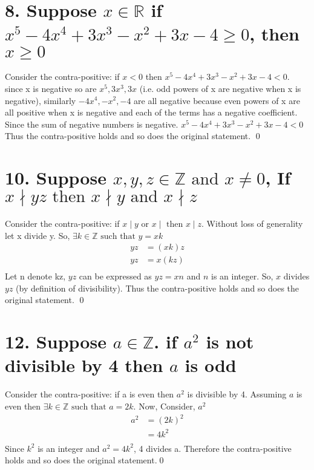 \documentclass{article}
\newcommand{\ints}{\mathbb{Z}}
\newcommand{\st}{\text{ such that }}
\begin{document}
	
	\section*{8. Suppose $x \in \mathbb{R} $ if $x^5-4x^4+3x^3-x^2+3x-4 \ge 0$, then $x\ge 0$ }
	Consider the contra-positive: if $x < 0$ then $x^5-4x^4+3x^3-x^2+3x-4 < 0$. since x is negative so are $x^5, 3x^3, 3x$ (i.e. odd powers of x are negative when x is negative), similarly $-4x^4, -x^2, -4$ are all negative because even powers of x are all positive when x is negative and each of the terms has a negative coefficient. Since the sum of negative numbers is negative. $x^5-4x^4+3x^3-x^2+3x-4 < 0$ Thus the contra-positive holds and so does the original statement. \qed
	
	\section*{10. Suppose $x, y, z \in \mathbb{Z} \text{ and } x \neq 0$, If $x \nmid yz \text{ then } x \nmid y \text{ and } x \nmid z $ }
	Consider the contra-positive: if $x \mid y \text{ or } x \mid \text{ then } x \mid z $. Without loss of generality let x divide y. 
	So, $ \exists k \in \ints \st y = xk $ 
	\begin{align*}
		yz &= (xk)z\\
		yz &= x(kz)\\
	\end{align*}
	Let n denote kz, $yz$ can be expressed as $yz = xn$ and $n$ is an integer. So, $x$ divides $yz$ (by definition of divisibility). Thus the contra-positive holds and so does the original statement.
	\qed
	\section*{12. Suppose $a \in \ints $. if $a^2$ is not divisible by 4 then $a$ is odd}
	Consider the contra-positive: if a is even then $a^2$ is divisible by 4. Assuming $a$ is even then $\exists k \in \ints \st a = 2k$. 
	Now, Consider, $a^2$ 
	\begin{align*}
		a^2 &= (2k)^2\\
		&= 4k^2 \\
	\end{align*}
	Since $k^2$ is an integer and $a^2= 4k^2$, 4 divides a. Therefore the contra-positive holds and so does the original statement.\qed
	
\end{document}
